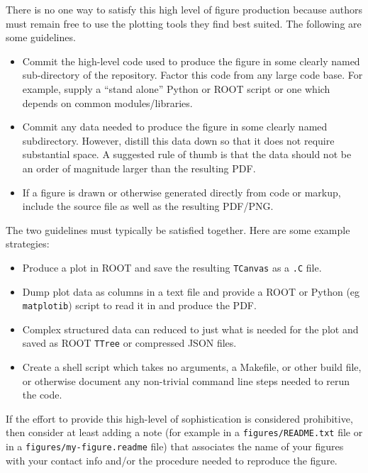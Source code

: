 There is no one way to satisfy this high level of figure production
because authors must remain free to use the plotting tools they find
best suited.  The following are some guidelines.

\begin{itemize}
\item Commit the high-level code used to produce the figure in some
  clearly named sub-directory of the repository.  Factor this code
  from any large code base.  For example, supply a ``stand alone''
  Python or ROOT script or one which depends on common
  modules/libraries.
  
\item Commit any data needed to produce the figure in some clearly
  named subdirectory.  However, distill this data down so that it does
  not require substantial space.  A suggested rule of thumb is that
  the data should not be an order of magnitude larger than the
  resulting PDF.

\item If a figure is drawn or otherwise generated directly from code
  or markup, include the source file as well as the resulting PDF/PNG.

\end{itemize}

The two guidelines must typically be satisfied together.  Here are
some example strategies:

\begin{itemize}
\item Produce a plot in ROOT and save the resulting \texttt{TCanvas}
  as a \texttt{.C} file.
\item Dump plot data as columns in a text file and provide a ROOT or
  Python (eg \texttt{matplotib}) script to read it in and produce the
  PDF.
\item Complex structured data can reduced to just what is needed for
  the plot and saved as ROOT \texttt{TTree} or compressed JSON files.
\item Create a shell script which takes no arguments, a Makefile, or
  other build file, or otherwise document any non-trivial command line
  steps needed to rerun the code.
\end{itemize}

If the effort to provide this high-level of sophistication is
considered prohibitive, then consider at least adding a note (for
example in a \texttt{figures/README.txt} file or in a
\texttt{figures/my-figure.readme} file) that associates the name of
your figures with your contact info and/or the procedure needed to
reproduce the figure.

